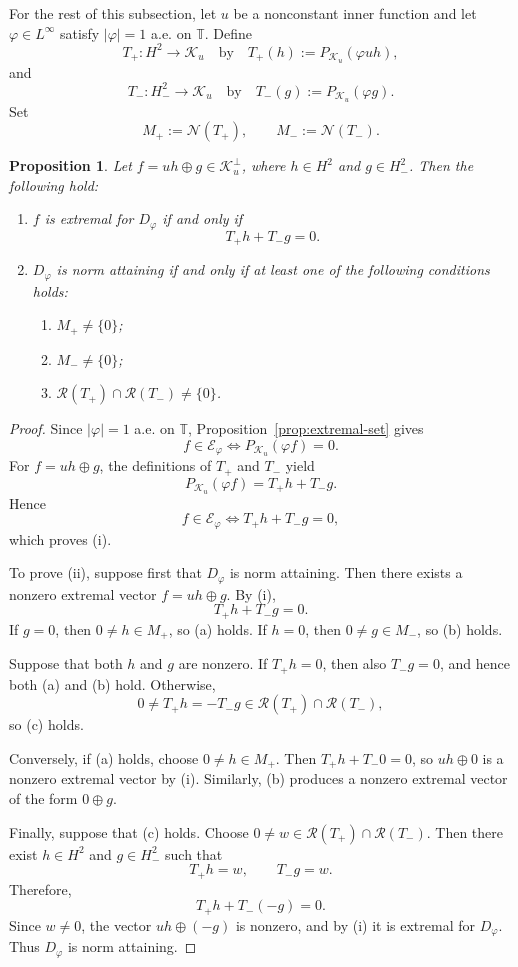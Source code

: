 \documentclass[12pt]{amsart}
\newtheorem{proposition}[theorem]{Proposition}
\theoremstyle{definition}
\theoremstyle{remark}
\def \T{\mathbb{T}}
\newcommand{\clr}{\mathcal{R}}
\newcommand{\cle}{\mathcal{E}}
\newcommand{\cln}{\mathcal{N}}
\newcommand{\clk}{\mathcal{K}}
\newcommand{\vp}{\varphi}
\numberwithin{equation}{section}
\begin{document}
For the rest of this subsection, let $u$ be a nonconstant inner function and let $\vp\in L^\infty$ satisfy $|\vp|=1$ a.e. on $\T$. Define
\[
T_{+}:H^2\longrightarrow\clk_u
\quad\text{by}\quad
T_{+}(h):=P_{\clk_u}(\vp uh),
\]
and
\[
T_{-}:H^2_{-}\longrightarrow\clk_u
\quad\text{by}\quad
T_{-}(g):=P_{\clk_u}(\vp g).
\]
Set
\[
M_{+}:=\cln(T_{+}),
\qquad
M_{-}:=\cln(T_{-}).
\]


\begin{proposition}\label{prop:Tpm-extremal-NA}
Let $f=uh\oplus g\in\clk_u^\perp$, where $h\in H^2$ and $g\in H^2_{-}$. Then the following hold:
\begin{enumerate}
\item $f$ is extremal for $D_\vp$ if and only if
		\[
		T_{+}h+T_{-}g=0.
		\]
		
\item $D_\vp$ is norm attaining if and only if at least one of the following conditions holds:
\begin{enumerate}
\item[\textup{(a)}] $M_{+}\neq\{0\}$;
\item[\textup{(b)}] $M_-\neq\{0\}$;
\item[\textup{(c)}] $\clr(T_{+})\cap\clr(T_{-})\neq\{0\}$.
\end{enumerate}
\end{enumerate}
\end{proposition}

\begin{proof}
Since $|\vp|=1$ a.e. on $\T$, Proposition~\ref{prop:extremal-set}
gives
\[
f\in\cle_\vp \iff P_{\clk_u}(\vp f)=0.
\]
For $f=uh\oplus g$, the definitions of $T_{+}$ and $T_{-}$ yield
\[
P_{\clk_u}(\vp f)=T_{+}h+T_{-}g.
\]
Hence
\[
f\in\cle_\vp \iff T_{+}h+T_{-}g=0,
\]
which proves \textup{(i)}.
	
To prove \textup{(ii)}, suppose first that $D_\vp$ is norm attaining. Then there exists a nonzero extremal vector $f=uh\oplus g$. By \textup{(i)},
\[
T_{+}h+T_{-}g=0.
\]
If $g=0$, then $0\neq h\in M_{+}$, so \textup{(a)} holds. If $h=0$,
then $0\neq g\in M_-$, so \textup{(b)} holds.
	
Suppose that both $h$ and $g$ are nonzero. If $T_{+}h=0$, then also
$T_{-}g=0$, and hence both \textup{(a)} and \textup{(b)} hold. Otherwise,
\[
0\neq T_{+}h=-T_{-}g\in\clr(T_{+})\cap\clr(T_{-}),
\]
so \textup{(c)} holds.
	
Conversely, if \textup{(a)} holds, choose $0\neq h\in M_{+}$. Then
$T_{+}h+T_{-}0=0$, so $uh\oplus0$ is a nonzero extremal vector by
\textup{(i)}. Similarly, \textup{(b)} produces a nonzero extremal
vector of the form $0\oplus g$.
	
Finally, suppose that \textup{(c)} holds. Choose $0\neq w\in\clr(T_{+})\cap\clr(T_{-})$. Then there exist $h\in H^2$ and $g\in H^2_{-}$ such that
\[
T_{+}h=w,\qquad T_{-}g=w.
\]
Therefore,
\[
T_{+}h+T_{-}(-g)=0.
\]
Since $w\neq0$, the vector $uh\oplus(-g)$ is nonzero, and by \textup{(i)} it is extremal for $D_\vp$. Thus $D_\vp$ is norm attaining.
\end{proof}
\end{document}
